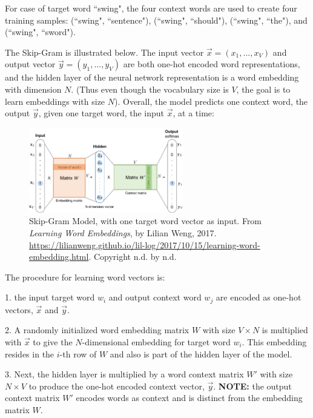 For case of target word ``swing", the four context words are used to create four training samples: (``swing", ``sentence"), (``swing", ``should"), (``swing", ``the"), and (``swing", ``sword"). 

The Skip-Gram is illustrated below. The input vector $\overrightarrow{x} = (x_1,..., x_V)$ and output vector $\overrightarrow{y} = (y_1,...,y_V)$ are both one-hot encoded word representations, and the hidden layer of the neural network representation is a word embedding with dimension $N$. (Thus even though the vocabulary size is $V$, the goal is to learn embeddings with size $N$). Overall, the model predicts one context word, the output $\overrightarrow{y}$, given one target word, the input $\overrightarrow{x}$, at a time: 

\begin{figure}[h]
\centering
\includegraphics[width=0.6\textwidth]{imgs/skipgram_image.png}
\caption{Skip-Gram Model, with one target word vector as input. From \emph{Learning Word Embeddings}, by Lilian Weng, 2017. \url{https://lilianweng.github.io/lil-log/2017/10/15/learning-word-embedding.html}. Copyright n.d. by n.d.}
\end{figure}

The procedure for learning word vectors is: 

1. the input target word $w_i$ and output context word $w_j$ are encoded as one-hot vectors, $\overrightarrow{x}$ and $\overrightarrow{y}$.

2. A randomly initialized word embedding matrix $W$ with size $V \times N$ is multiplied with $\overrightarrow{x}$ to give the $N$-dimensional embedding for target word $w_i$. This embedding resides in the $i$-th row of $W$ and also is part of the hidden layer of the model. 

3. Next, the hidden layer is multiplied by a word context matrix $W'$ with size $N \times V$ to produce the one-hot encoded context vector, $\overrightarrow{y}$. \textbf{NOTE: }the output context matrix $W'$ encodes words as context and is distinct from the embedding matrix $W$. 

